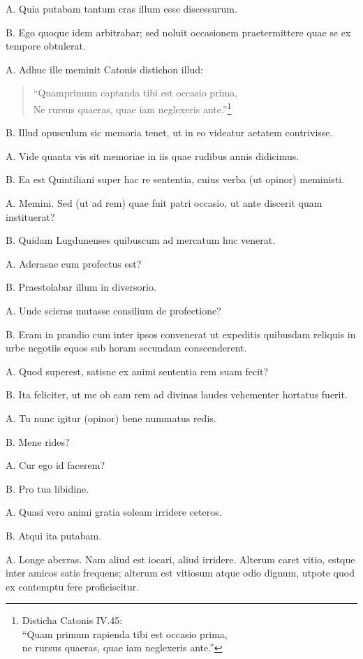 \documentclass{article}
\begin{document}
A. Quia putabam tantum cras illum esse discessurum.

B. Ego quoque idem arbitrabar; sed noluit occasionem praetermittere quae se ex tempore obtulerat.

A. Adhuc ille meminit Catonis distichon illud: \begin{verse} ``Quamprimum captanda tibi est occasio prima,\\ Ne rursus quaeras, quae iam neglexeris ante.''\footnote{Disticha Catonis IV.45:\\``Quam primum rapienda tibi est occasio prima,\\ne rursus quaeras, quae iam neglexeris ante.''}\end{verse}

B. Illud opusculum sic memoria tenet, ut in eo videatur aetatem contrivisse.

A. Vide quanta vis sit memoriae in iis quae rudibus annis didicimus.

B. Ea est Quintiliani super hac re sententia, cuius verba (ut opinor) meministi.

A. Memini. Sed (ut ad rem) quae fuit patri occasio, ut ante discerit quam instituerat?

B. Quidam Lugdunenses quibuscum ad mercatum huc venerat.

A. Aderasne cum profectus est?

B. Praestolabar illum in diversorio.

A. Unde scieras mutasse consilium de profectione?

B. Eram in prandio cum inter ipsos convenerat ut expeditis quibusdam reliquis in urbe negotiis equos sub horam secundam conscenderent.

A. Quod superest, satisne ex animi sententia rem suam fecit?

B. Ita feliciter, ut me ob eam rem ad divinas laudes vehementer hortatus fuerit.

A. Tu nunc igitur (opinor) bene nummatus redis.

B. Mene rides?

A. Cur ego id facerem?

B. Pro tua libidine.

A. Quasi vero animi gratia soleam irridere ceteros.

B. Atqui ita putabam.

A. Longe aberras. Nam aliud est iocari, aliud irridere. Alterum caret vitio, estque inter amicos satis frequens; alterum est vitiosum atque odio dignum, utpote quod ex contemptu fere proficiscitur.
\end{document}
